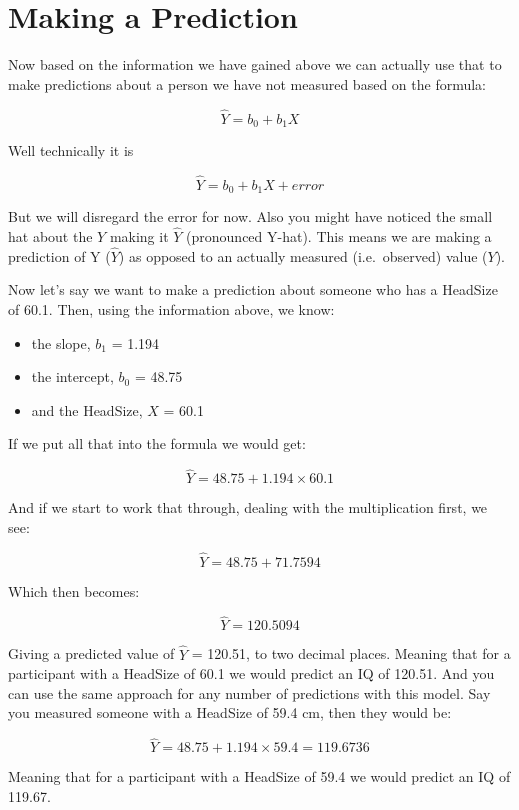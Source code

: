 \documentclass[
  oneside]{book}
\providecommand{\tightlist}{%
  \setlength{\itemsep}{0pt}\setlength{\parskip}{0pt}}
\begin{document}
\hypertarget{making-a-prediction}{%
\section{Making a Prediction}\label{making-a-prediction}}

Now based on the information we have gained above we can actually use that to make predictions about a person we have not measured based on the formula:

\[\hat{Y} = b_{0} + b_{1}X\]

Well technically it is

\[\hat{Y} = b_{0} + b_{1}X + error\]

But we will disregard the error for now. Also you might have noticed the small hat about the \(Y\) making it \(\hat{Y}\) (pronounced Y-hat). This means we are making a prediction of Y (\(\hat{Y}\)) as opposed to an actually measured (i.e.~observed) value (\(Y\)).

Now let's say we want to make a prediction about someone who has a HeadSize of 60.1. Then, using the information above, we know:

\begin{itemize}
\tightlist
\item
  the slope, \(b_{1}\) = 1.194
\item
  the intercept, \(b_{0}\) = 48.75
\item
  and the HeadSize, \(X\) = 60.1
\end{itemize}

If we put all that into the formula we would get:

\[\hat{Y} = 48.75 + 1.194 \times 60.1\]

And if we start to work that through, dealing with the multiplication first, we see:

\[\hat{Y} = 48.75 + 71.7594\]

Which then becomes:

\[\hat{Y} = 120.5094\]

Giving a predicted value of \(\hat{Y}\) = 120.51, to two decimal places. Meaning that for a participant with a HeadSize of 60.1 we would predict an IQ of 120.51. And you can use the same approach for any number of predictions with this model. Say you measured someone with a HeadSize of 59.4 cm, then they would be:

\[\hat{Y} = 48.75 + 1.194 \times 59.4 = 119.6736\]

Meaning that for a participant with a HeadSize of 59.4 we would predict an IQ of 119.67.
\end{document}
